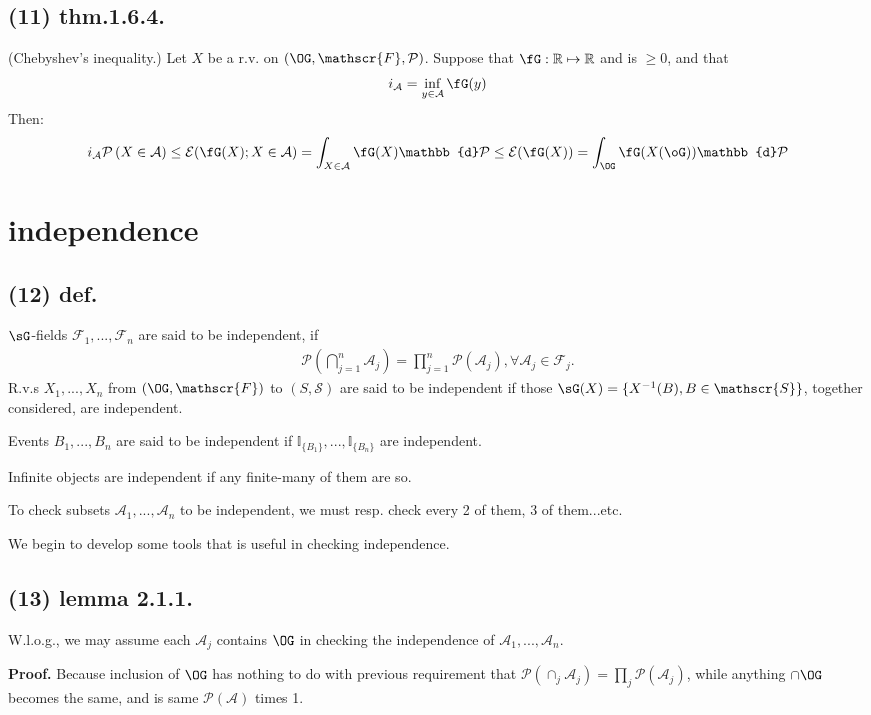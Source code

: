 \documentclass[12pt]{article}
\newcommand\Ev\forall%
\newcommand{\dd}{ \BF{d} }%
\newcommand{\Rb}[1]{ \left( #1 \right) }%
\newcommand{\BF}[1]{ \mathbb{#1} }%
\newcommand{\CF}[1]{ \mathcal{#1} }%
\newcommand{\SF}[1]{ \mathscr{#1} }%
\newcommand{\Ss}[1]{\textsf{\textbf{#1}}}%
\newcommand{\EqGo}[1]{ \begin{gather*}{#1}\end{gather*} } %
\renewcommand{\P}[1]{ \CF{P} \Rb{#1} }%
\newcommand{\I}[1]{ \BF I_{\{#1\}} }%
\begin{document}
\subsection*{(11) thm.1.6.4.} (Chebyshev's inequality.) Let \(X\) be a r.v. on \(( \OG, \SF{F}, \CF{P} )\). 
Suppose that \(\fG: \BF R \mapsto \BF R\) and is \(\geq 0\), 
and that \EqGo{
i_{\CF A} = \inf_{y \in \CF A} \fG(y) 
} Then: \EqGo{
 i_{\CF A} \P{ X \in \CF A } 
 \leq \CF E(\fG(X); X \in \CF A)
 = \int_{ X \in \CF A} \fG(X) \dd \CF{P}
 \leq \CF E(\fG(X))
 = \int_\OG \fG(X(\oG)) \dd \CF{P}
}

\section{independence}
\subsection*{(12) def.} \(\sG\)-fields \(\SF{F}_1,...,\SF{F}_n\) are said to be independent, if \EqGo{
 \P{ \bigcap_{j=1}^n \SF{A}_j } 
 = \prod_{j=1}^n \P{\SF{A}_j}, 
 \Ev \SF{A}_j \in \SF{F}_j.
} \indent R.v.s \(X_1,...,X_n\) from \((\OG, \SF{F})\) to \((S, \SF S)\) are said to be independent if those \(\sG(X) = \{ X^{-1}(B), B \in \SF S \}\), together considered, are independent. \par
Events \(B_1,...,B_n\) are said to be independent if \(\I{B_1},...,\I{B_n}\) are independent. \par
Infinite objects are independent if any finite-many of them are so. \par
To check subsets \(\SF{A}_1,...,\SF{A}_n\) to be independent, we must resp. check every 2 of them, 3 of them...etc. \par
[Sep. 24] We begin to develop some tools that is useful in checking independence.

\subsection*{(13) lemma 2.1.1.} W.l.o.g., we may assume each \(\SF{A}_j\) contains \(\OG\) in checking the independence of \(\SF{A}_1,...,\SF{A}_n\). \par
\Ss{Proof.} Because inclusion of \(\OG\) has nothing to do with previous requirement that \(\P{ \cap_j \SF{A}_j } =\prod_j \P{\SF{A}_j}\), while anything \(\cap \OG\) becomes the same, and is same \(\P{\SF{A}}\) times 1. \par
\end{document}
